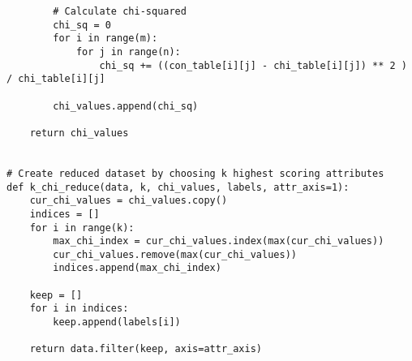 \documentclass[11pt, a4paper]{article}
\begin{document}
\begin{verbatim}
        # Calculate chi-squared
        chi_sq = 0
        for i in range(m):
            for j in range(n):
                chi_sq += ((con_table[i][j] - chi_table[i][j]) ** 2 ) / chi_table[i][j]

        chi_values.append(chi_sq)
        
    return chi_values


# Create reduced dataset by choosing k highest scoring attributes
def k_chi_reduce(data, k, chi_values, labels, attr_axis=1):
    cur_chi_values = chi_values.copy()
    indices = []
    for i in range(k):
        max_chi_index = cur_chi_values.index(max(cur_chi_values))
        cur_chi_values.remove(max(cur_chi_values))
        indices.append(max_chi_index)
    
    keep = []
    for i in indices:
        keep.append(labels[i])
        
    return data.filter(keep, axis=attr_axis)
\end{verbatim}
\end{document}
